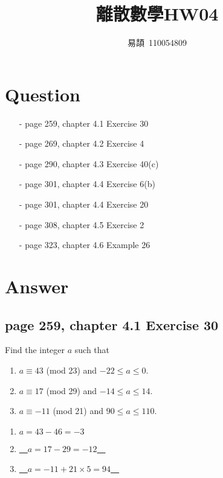 \documentclass[sigconf]{acmart}
\begin{document}
\title{離散數學HW04}

\author{易頡~110054809}
\orcid{}

\renewcommand\footnotetextcopyrightpermission[1]{} %
\pagestyle{plain} %

\maketitle

\section{Question}
\begin{itemize}
	\item[-] page 259, chapter 4.1 Exercise 30
	\item[-] page 269, chapter 4.2 Exercise 4
	\item[-] page 290, chapter 4.3 Exercise 40(c)
	\item[-] page 301, chapter 4.4 Exercise 6(b)
	\item[-] page 301, chapter 4.4 Exercise 20	
	\item[-] page 308, chapter 4.5 Exercise 2
	\item[-] page 323, chapter 4.6 Example 26
\end{itemize}

\section{Answer}
\subsection{page 259, chapter 4.1 Exercise 30}
\begin{shaded}
    Find the integer $a$ such that
    \begin{enumerate}[label=(\alph*)]
    	\item $a \equiv 43$ (mod 23) and $-22 \leq a \leq 0.$
    	\item $a \equiv 17$ (mod 29) and $-14 \leq a \leq 14.$
    	\item $a \equiv -11$ (mod 21) and $90 \leq a \leq 110.$
    \end{enumerate}
\end{shaded}  
\begin{enumerate}[label=(\alph*)]
	\item $a = 43-46 = -3$
	\item \uline{~~$a = 17-29 = -12$~~}
	\item \uline{~~$a = -11 + 21 \times 5 = 94$~~}
\end{enumerate}
\end{document}
